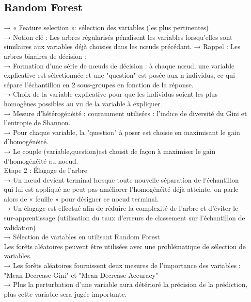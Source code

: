 \documentclass[12pt]{report}
\begin{document}
\subsection{Random Forest}
→ « Feature selection »: sélection des variables (les plus pertinentes)\\
→ Notion clé : Les arbres régularisés pénalisent les variables lorsqu’elles sont similaires aux variables déjà choisies dans les nœuds précédant.
→ Rappel : Les arbres binaires de décision :\\
→ Formation d’une série de nœuds de décision : à chaque nœud, une variable explicative est sélectionnée et une "question" est posée aux n individus, ce qui sépare l’échantillon en 2 sous-groupes en fonction de la réponse.\\
→ Choix de la variable explicative pour que les individus soient les plus homogènes possibles au vu de la variable à expliquer.\\
→ Mesure d’hétérogénéité : couramment utilisées : l’indice de diversité du Gini et l’entropie de Shannon.\\
→ Pour chaque variable, la "question" à poser est choisie en maximisant le gain d’homogénéité.\\
→ Le couple (variable,question)est choisit de façon à maximiser le gain d’homogénéité au noeud.\\
Etape 2 : Élagage de l’arbre\\
→ Un nœud devient terminal lorsque toute nouvelle séparation de l’échantillon qui lui est appliqué ne peut pas améliorer l’homogénéité déjà atteinte, on parle alors de « feuille » pour désigner ce noeud terminal. \\
→ Un élagage est effectué afin de réduire la complexité de l’arbre et d’éviter le sur-apprentissage (utilisation du taux d’erreurs de classement sur l’échantillon de validation)\\
→ Sélection de variables en utilisant Random Forest\\
Les forêts aléatoires peuvent être utilisées avec une problématique de sélection de variables.\\
→ Les forêts aléatoires fournissent deux mesures de l’importance des variables : "Mean Decrease Gini" et "Mean Decrease Accuracy"\\
→ Plus la perturbation d’une variable aura détérioré la précision de la prédiction, plus cette variable sera jugée importante.\\
\end{document}
